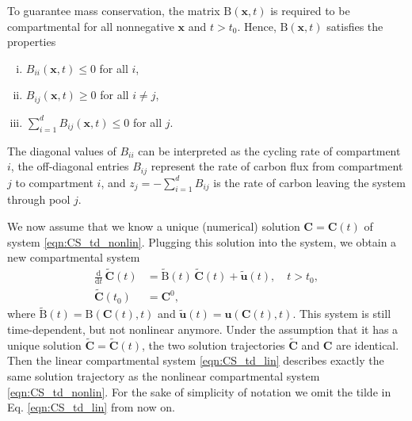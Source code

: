 \documentclass[11pt,a4paper]{article}
\renewcommand{\vec}[1]{\mathbf{#1}}
\newcommand{\tens}[1]{\mathrm{#1}}
\newcommand{\deriv}[1]{\frac{\mathrm{d}}{\mathrm{d}#1}}
\newcommand{\suml}{\sum\limits}
\begin{document}
    To guarantee mass conservation, the matrix $\tens{B}(\vec{x},t)$ is required to be compartmental 
    for all nonnegative $\vec{x}$ and $t>t_0$.
    Hence, $\tens{B}(\vec{x},t)$ satisfies the properties
    \begin{enumerate}[(i)]
        \item $B_{ii}(\vec{x},t)\leq0$ for all $i$,
        \item $B_{ij}(\vec{x},t)\geq0$ for all $i\neq j$,
        \item $\suml_{i=1}^d B_{ij}(\vec{x},t)\leq0$ for all $j$.
    \end{enumerate}
    The diagonal values of $B_{ii}$ can be interpreted as the cycling rate of compartment $i$, the off-diagonal entries $B_{ij}$ represent the rate of carbon flux from compartment $j$ to compartment $i$, and $z_j=-\sum_{i=1}^d B_{ij}$ is the rate of carbon leaving the system through pool $j$.
    
    We now assume that we know a unique (numerical) solution $\vec{C}=\vec{C}(t)$ of system \eqref{eqn:CS_td_nonlin}.
    Plugging this solution into the system, we obtain a new compartmental system
    \begin{equation}\label{eqn:CS_td_lin}
        \begin{aligned}
            \deriv{t}\,\widetilde{\vec{C}}(t) &= \widetilde{\tens{B}}(t)\,\widetilde{\vec{C}}(t) + \widetilde{\vec{u}}(t),\quad t>t_0,\\
            \widetilde{\vec{C}}(t_0) &= \vec{C}^0,
        \end{aligned}
    \end{equation}
    where $\widetilde{\tens{B}}(t)=\tens{B}(\vec{C}(t),t)$ and $\widetilde{\vec{u}}(t)=\vec{u}(\vec{C}(t),t)$.
    This system is still time-dependent, but not nonlinear anymore.
    Under the assumption that it has a unique solution $\widetilde{\vec{C}}=\widetilde{\vec{C}}(t)$, the two solution trajectories $\widetilde{\vec{C}}$ and $\vec{C}$ are identical.
    Then the linear compartmental system \eqref{eqn:CS_td_lin} describes exactly the same solution trajectory as the nonlinear compartmental system \eqref{eqn:CS_td_nonlin}.
    For the sake of simplicity of notation we omit the tilde in Eq. \eqref{eqn:CS_td_lin} from now on.
    
\end{document}
